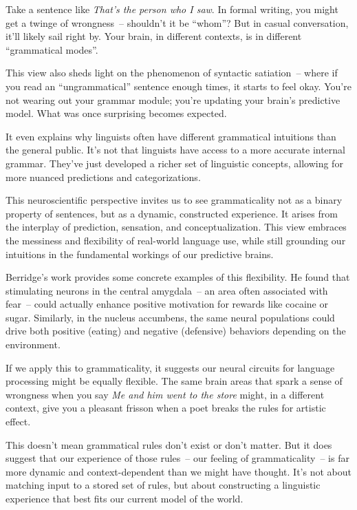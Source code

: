Take a sentence like \textit{That's the person who I saw}. In formal writing, you might get a twinge of wrongness~-- shouldn't it be ``whom''? But in casual conversation, it'll likely sail right by. Your brain, in different contexts, is in different ``grammatical modes''.

This view also sheds light on the phenomenon of syntactic satiation~-- where if you read an ``ungrammatical'' sentence enough times, it starts to feel okay. You're not wearing out your grammar module; you're updating your brain's predictive model. What was once surprising becomes expected.

It even explains why linguists often have different grammatical intuitions than the general public. It's not that linguists have access to a more accurate internal grammar. They've just developed a richer set of linguistic concepts, allowing for more nuanced predictions and categorizations.

This neuroscientific perspective invites us to see grammaticality not as a binary property of sentences, but as a dynamic, constructed experience. It arises from the interplay of prediction, sensation, and conceptualization. This view embraces the messiness and flexibility of real-world language use, while still grounding our intuitions in the fundamental workings of our predictive brains.

Berridge's work provides some concrete examples of this flexibility. He found that stimulating neurons in the central amygdala~-- an area often associated with fear~-- could actually enhance positive motivation for rewards like cocaine or sugar. Similarly, in the nucleus accumbens, the same neural populations could drive both positive (eating) and negative (defensive) behaviors depending on the environment.

If we apply this to grammaticality, it suggests our neural circuits for language processing might be equally flexible. The same brain areas that spark a sense of wrongness when you say \textit{Me and him went to the store} might, in a different context, give you a pleasant frisson when a poet breaks the rules for artistic effect.

This doesn't mean grammatical rules don't exist or don't matter. But it does suggest that our experience of those rules~-- our feeling of grammaticality~-- is far more dynamic and context-dependent than we might have thought. It's not about matching input to a stored set of rules, but about constructing a linguistic experience that best fits our current model of the world.

